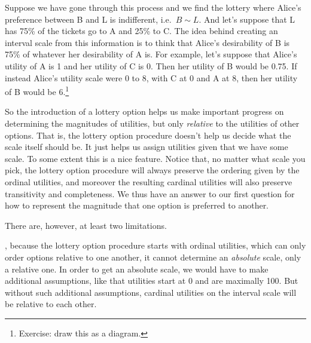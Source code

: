 \documentclass[]{tufte-book}
\begin{document}
Suppose we have gone through this process and we find the lottery where Alice's preference between B and L is indifferent, i.e.~\(B\sim L\). And let's suppose that L has 75\% of the tickets go to A and 25\% to C. The idea behind creating an interval scale from this information is to think that Alice's desirability of B is 75\% of whatever her desirability of A is. For example, let's suppose that Alice's utility of A is 1 and her utility of C is 0. Then her utility of B would be 0.75. If instead Alice's utility scale were 0 to 8, with C at 0 and A at 8, then her utility of B would be 6.\footnote{Exercise: draw this as a diagram.}

So the introduction of a lottery option helps us make important progress on determining the magnitudes of utilities, but only \emph{relative} to the utilities of other options. That is, the lottery option procedure doesn't help us decide what the scale itself should be. It just helps us assign utilities given that we have some scale. To some extent this is a nice feature. Notice that, no matter what scale you pick, the lottery option procedure will always preserve the ordering given by the ordinal utilities, and moreover the resulting cardinal utilities will also preserve transitivity and completeness. We thus have an answer to our first question for how to represent the magnitude that one option is preferred to another.

There are, however, at least two limitations.

, because the lottery option procedure starts with ordinal utilities, which can only order options relative to one another, it cannot determine an \emph{absolute} scale, only a relative one. In order to get an absolute scale, we would have to make additional assumptions, like that utilities start at 0 and are maximally 100. But without such additional assumptions, cardinal utilities on the interval scale will be relative to each other.
\end{document}
